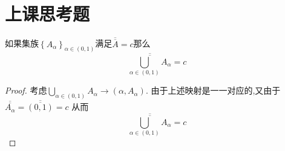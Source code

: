 \section{上课思考题}
如果集族\(\left\{A_{\alpha}\right\}_{\alpha \in (0,1)}\)满足\(\overline{\overline{A}}=c\)那么\[\overline{\overline{\bigcup\limits_{\alpha\in (0,1)}A_{\alpha}}}=c\]
\begin{proof}
    考虑\(\bigcup\limits_{\alpha \in (0,1)}A_{\alpha} \rightarrow (\alpha , A_{\alpha})\).
    由于上述映射是一一对应的,又由于\(\overline{\overline{A_{\alpha}}}=\overline{\overline{(0,1)}} = c\)
    从而\[\overline{\overline{\bigcup\limits_{\alpha \in (0,1)}A_{\alpha}}} = c \]
\end{proof}